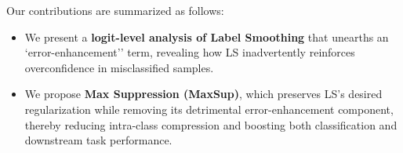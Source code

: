 Our contributions are summarized as follows:
\vspace{-2mm}
\begin{itemize}
    \item We present a \textbf{logit-level analysis of Label Smoothing} that unearths an `error-enhancement'' term, revealing how LS inadvertently reinforces overconfidence in misclassified samples.
    \item We propose \textbf{Max Suppression (MaxSup)}, which preserves LS’s desired regularization while removing its detrimental error-enhancement component, thereby reducing intra-class compression and boosting both classification and downstream task performance.
\end{itemize}
